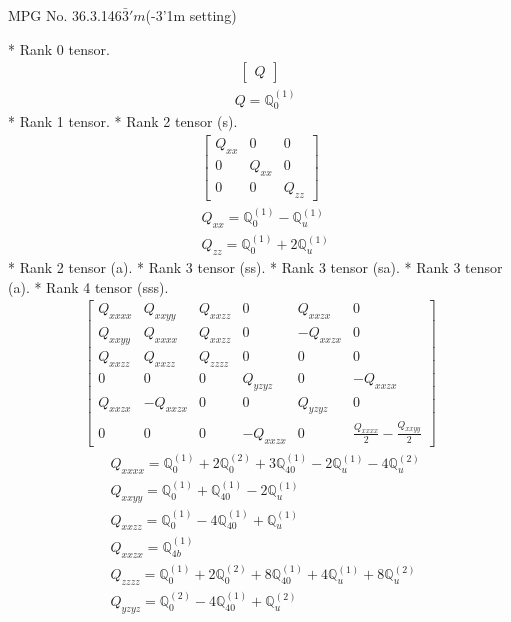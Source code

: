 \documentclass[fleqn,8pt,landscape]{jsarticle}
\begin{document}
\setcounter{MaxMatrixCols}{32}

\renewcommand{\tablename}{Table~}
\renewcommand{\figurename}{Figure~}
\begin{center}
\LARGE
MPG No. 36.3.146\quad$\bar{3}'m$\quad(-3'1m setting)
\end{center}
* Rank 0 tensor.
\begin{align*}
\begin{bmatrix} Q \end{bmatrix}
\end{align*}
\begin{align*}
& Q = \mathbb{Q}_{0}^{(1)}
\end{align*}
* Rank 1 tensor.
* Rank 2 tensor (s).
\begin{align*}
\begin{bmatrix} Q_{xx} & 0 & 0 \\ 0 & Q_{xx} & 0 \\ 0 & 0 & Q_{zz} \end{bmatrix}
\end{align*}
\begin{align*}
& Q_{xx} = \mathbb{Q}_{0}^{(1)} - \mathbb{Q}_{u}^{(1)} \\
& Q_{zz} = \mathbb{Q}_{0}^{(1)} + 2 \mathbb{Q}_{u}^{(1)}
\end{align*}
* Rank 2 tensor (a).
* Rank 3 tensor (ss).
* Rank 3 tensor (sa).
* Rank 3 tensor (a).
* Rank 4 tensor (sss).
\begin{align*}
\begin{bmatrix} Q_{xxxx} & Q_{xxyy} & Q_{xxzz} & 0 & Q_{xxzx} & 0 \\ Q_{xxyy} & Q_{xxxx} & Q_{xxzz} & 0 & - Q_{xxzx} & 0 \\ Q_{xxzz} & Q_{xxzz} & Q_{zzzz} & 0 & 0 & 0 \\ 0 & 0 & 0 & Q_{yzyz} & 0 & - Q_{xxzx} \\ Q_{xxzx} & - Q_{xxzx} & 0 & 0 & Q_{yzyz} & 0 \\ 0 & 0 & 0 & - Q_{xxzx} & 0 & \frac{Q_{xxxx}}{2} - \frac{Q_{xxyy}}{2} \end{bmatrix}
\end{align*}
\begin{align*}
& Q_{xxxx} = \mathbb{Q}_{0}^{(1)} + 2 \mathbb{Q}_{0}^{(2)} + 3 \mathbb{Q}_{40}^{(1)} - 2 \mathbb{Q}_{u}^{(1)} - 4 \mathbb{Q}_{u}^{(2)} \\
& Q_{xxyy} = \mathbb{Q}_{0}^{(1)} + \mathbb{Q}_{40}^{(1)} - 2 \mathbb{Q}_{u}^{(1)} \\
& Q_{xxzz} = \mathbb{Q}_{0}^{(1)} - 4 \mathbb{Q}_{40}^{(1)} + \mathbb{Q}_{u}^{(1)} \\
& Q_{xxzx} = \mathbb{Q}_{4b}^{(1)} \\
& Q_{zzzz} = \mathbb{Q}_{0}^{(1)} + 2 \mathbb{Q}_{0}^{(2)} + 8 \mathbb{Q}_{40}^{(1)} + 4 \mathbb{Q}_{u}^{(1)} + 8 \mathbb{Q}_{u}^{(2)} \\
& Q_{yzyz} = \mathbb{Q}_{0}^{(2)} - 4 \mathbb{Q}_{40}^{(1)} + \mathbb{Q}_{u}^{(2)}
\end{align*}
\end{document}
